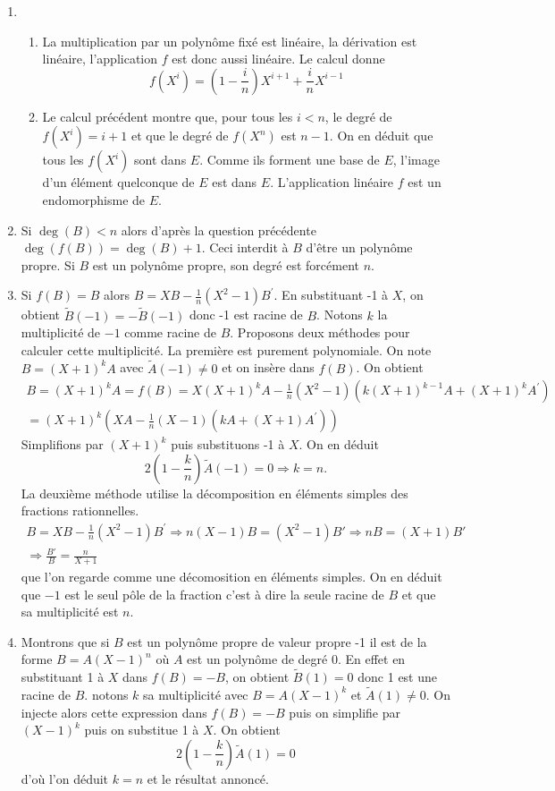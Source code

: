 \begin{enumerate}
\item \begin{enumerate}
\item La multiplication par un polynôme fixé est linéaire, la dérivation est linéaire, l'application $f$ est donc aussi linéaire. Le calcul donne
\[f(X^i)=(1-\frac{i}{n})X^{i+1}+\frac{i}{n}X^{i-1}\]
\item Le calcul précédent montre que, pour tous les $i<n$, le degré de $f(X^i) = i + 1$ et que le degré de $f(X^n)$ est $n-1$. On en déduit que tous les $f(X^i)$ sont dans $E$. Comme ils forment une base de $E$, l'image d'un élément quelconque de $E$ est dans $E$. L'application linéaire $f$ est un endomorphisme de $E$.
\end{enumerate}
\item Si $\deg(B)<n$ alors d'après la question précédente $\deg(f(B))=\deg(B)+1$. Ceci interdit à $B$ d'être un polynôme propre. Si $B$ est un polynôme propre, son degré est forcément $n$.
\item Si $f(B)=B$ alors $B=XB-\frac{1}{n}(X^2-1)B^\prime$. En substituant -1 à $X$, on obtient $\tilde{B}(-1)=-\tilde{B}(-1)$ donc -1 est racine de $B$.\newline
Notons $k$ la multiplicité de $-1$ comme racine de $B$. Proposons deux méthodes pour calculer cette multiplicité.\newline
La première est purement polynomiale. On note $B=(X+1)^k A$ avec $\tilde{A}(-1)\neq 0$ et on insère dans $f(B)$. On obtient
\begin{multline*}
 B = (X+1)^kA = f(B) = X(X+1)^kA - \frac{1}{n}(X^2-1)\left(  k(X+1)^{k-1}A+(X+1)^{k}A^\prime \right)  \\
  = (X+1)^k (  XA-\frac{1}{n}(X-1)(kA+(X+1)A^\prime) ) 
\end{multline*}
Simplifions par $(X+1)^k$ puis substituons -1 à $X$. On en déduit
\[
2(1-\frac{k}{n})\tilde{A}(-1) = 0 \Rightarrow k = n.
\]
La deuxième méthode utilise la décomposition en éléments simples des fractions rationnelles. 
\begin{multline*}
  B=XB-\frac{1}{n}(X^2-1)B^\prime \Rightarrow n(X-1)B = (X^2 - 1)B' \Rightarrow nB = (X+1)B' \\
  \Rightarrow \frac{B'}{B} = \frac{n}{X + 1}
\end{multline*}
que l'on regarde comme une décomosition en éléments simples. On en déduit que $-1$ est le seul pôle de la fraction c'est à dire la seule racine de $B$ et que sa multiplicité est $n$. 
\item Montrons que si $B$ est un polynôme propre de valeur propre -1 il est de la forme $B=A(X-1)^n$ où $A$ est un polynôme de degré 0.\newline
En effet en substituant 1 à $X$ dans $f(B)=-B$, on obtient $\tilde{B}(1)=0$ donc 1 est une racine de $B$. notons $k$ sa multiplicité avec $B=A(X-1)^k$ et $\tilde{A}(1)\neq 0$. On injecte alors cette expression dans $f(B)=-B$ puis on simplifie par $(X-1)^k$ puis on substitue 1 à $X$. On obtient
\[2(1-\frac{k}{n})\tilde{A}(1)=0\]
d'où l'on déduit $k=n$ et le résultat annoncé.


\end{enumerate}
